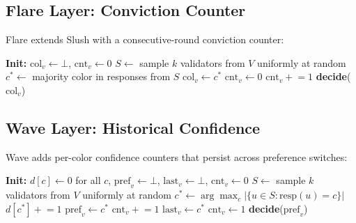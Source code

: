 \subsection{Flare Layer: Conviction Counter}

Flare extends Slush with a consecutive-round conviction counter:

\begin{algorithm}
\caption{Flare: Conviction-Based Finalization}
\label{alg:flare}
\begin{algorithmic}[1]
\State \textbf{Init:} $\text{col}_v \leftarrow \bot$, $\text{cnt}_v \leftarrow 0$
        \State $S \leftarrow$ sample $k$ validators from $V$ uniformly at random
        \State $c^* \leftarrow$ majority color in responses from $S$
                \State $\text{col}_v \leftarrow c^*$
                \State $\text{cnt}_v \leftarrow 0$ 
            \EndIf
            \State $\text{cnt}_v \mathrel{+}= 1$
        \EndIf
    \EndWhile
    \State \textbf{decide}($\text{col}_v$)
\EndProcedure
\end{algorithmic}
\end{algorithm}

\subsection{Wave Layer: Historical Confidence}

Wave adds per-color confidence counters that persist across preference switches:

\begin{algorithm}
\caption{Wave: Persistent Confidence Counters}
\label{alg:wave}
\begin{algorithmic}[1]
\State \textbf{Init:} $d[c] \leftarrow 0$ for all $c$, $\text{pref}_v \leftarrow \bot$, $\text{last}_v \leftarrow \bot$, $\text{cnt}_v \leftarrow 0$
        \State $S \leftarrow$ sample $k$ validators from $V$ uniformly at random
        \State $c^* \leftarrow \arg\max_c |\{u \in S : \text{resp}(u) = c\}|$
            \State $d[c^*] \mathrel{+}= 1$
                \State $\text{pref}_v \leftarrow c^*$ 
            \EndIf
                \State $\text{cnt}_v \mathrel{+}= 1$
            \Else
                \State $\text{last}_v \leftarrow c^*$
                \State $\text{cnt}_v \leftarrow 1$
            \EndIf
        \EndIf
    \EndWhile
    \State \textbf{decide}($\text{pref}_v$)
\EndProcedure
\end{algorithmic}
\end{algorithm}

